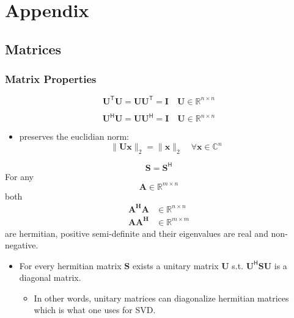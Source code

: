\section{Appendix}
\subsection{Matrices}
\subsubsection{Matrix Properties}\label{app:mat_prop}

\noindent\begin{equation*}
    \mathbf{U}^{\mathsf{T}}\mathbf{U}=\mathbf{UU}^{\mathsf{T}}=\mathbf{I}\quad \mathbf{U}\in \mathbb{R}^{n\times n}
\end{equation*}

\noindent\begin{equation*}
    \mathbf{U}^{\mathsf{H}}\mathbf{U}=\mathbf{UU}^{\mathsf{H}}=\mathbf{I}\quad \mathbf{U}\in \mathbb{R}^{n\times n}
\end{equation*}
\begin{itemize}
    \item preserves the euclidian norm:
          \noindent\begin{equation*}
              \|\mathbf{Ux}\| _2=\|\mathbf{x}\|_2 \quad \forall \mathbf{x} \in \mathbb{C}^n
          \end{equation*}
\end{itemize}

\noindent\begin{equation*}
    \mathbf{S}=\mathbf{S}^{\mathsf{H}}
\end{equation*}
For any
\noindent\begin{equation*}
    \mathbf{A} \in \mathbb{R}^{m\times n}
\end{equation*}
both
\noindent\begin{align*}
    \mathbf{A^H A} & \in \mathbb{R}^{n\times n} \\
    \mathbf{A A^H} & \in \mathbb{R}^{m\times m}
\end{align*}
are hermitian, positive semi-definite and their eigenvalues are real and non-negative.
\begin{itemize}
    \item For every hermitian matrix $\mathbf{S}$ exists a unitary matrix $\mathbf{U}$ s.t. $\mathbf{U}^{\mathsf{H}}\mathbf{SU}$ is a diagonal matrix.
          \begin{itemize}
              \item In other words, unitary matrices can diagonalize hermitian matrices which is what one uses for SVD.
          \end{itemize}
\end{itemize}


